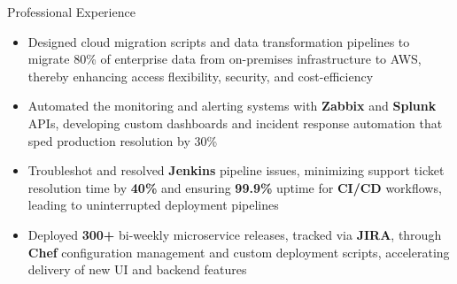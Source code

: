 \documentclass{resume}
\begin{document}
\begin{experienceSection}{Professional Experience}
    \experienceItem[
        company={Cerner Healthcare},
        location={Bangalore, KA},
        position={Software Engineer},
        duration={May 2021 - Jul 2023}
    ]
    \begin{itemize}
        \itemsep -6pt {}
        \item Designed cloud migration scripts and data transformation pipelines to migrate 80\% of enterprise data from on-premises infrastructure to AWS, thereby enhancing access flexibility, security, and cost-efficiency
        \item Automated the monitoring and alerting systems with \textbf{Zabbix} and \textbf{Splunk} APIs, developing custom dashboards and incident response automation that sped production resolution by 30\%
        \item Troubleshot and resolved \textbf{Jenkins} pipeline issues, minimizing support ticket resolution time by \textbf{40\%} and ensuring \textbf{99.9\%} uptime for \textbf{CI/CD} workflows, leading to uninterrupted deployment pipelines
        \item Deployed \textbf{300+} bi-weekly microservice releases, tracked via \textbf{JIRA}, through \textbf{Chef} configuration management and custom deployment scripts, accelerating delivery of new UI and backend features
    \end{itemize}

\end{experienceSection}
\end{document}
